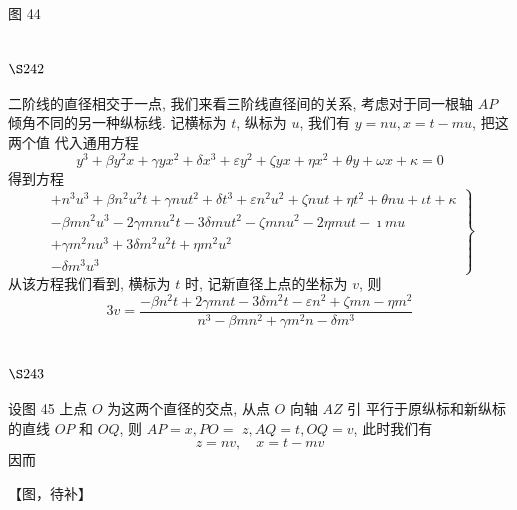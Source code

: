 图 44

\section{$\S 242$}

二阶线的直径相交于一点, 我们来看三阶线直径间的关系, 考虑对于同一根轴 $A P$ 倾角不同的另一种纵标线. 记横标为 $t$, 纵标为 $u$, 我们有 $y=n u, x=t-m u$, 把这两个值 代入通用方程
\[
y^{3}+\beta y^{2} x+\gamma y x^{2}+\delta x^{3}+\varepsilon y^{2}+\zeta y x+\eta x^{2}+\theta y+\omega x+\kappa=0
\]
得到方程
\[
\left.\begin{array}{l}
+n^{3} u^{3}+\beta n^{2} u^{2} t+\gamma n u t^{2}+\delta t^{3}+\varepsilon n^{2} u^{2}+\zeta n u t+\eta t^{2}+\theta n u+\iota t+\kappa \\
-\beta m n^{2} u^{3}-2 \gamma m n u^{2} t-3 \delta m u t^{2}-\zeta m n u^{2}-2 \eta m u t-\imath m u \\
+\gamma m^{2} n u^{3}+3 \delta m^{2} u^{2} t+\eta m^{2} u^{2} \\
-\delta m^{3} u^{3}
\end{array}\right\}
\]
从该方程我们看到, 横标为 $t$ 时, 记新直径上点的坐标为 $v$, 则
\[
3 v=\frac{-\beta n^{2} t+2 \gamma m n t-3 \delta m^{2} t-\varepsilon n^{2}+\zeta m n-\eta m^{2}}{n^{3}-\beta m n^{2}+\gamma m^{2} n-\delta m^{3}}
\]
\section{$\S 243$}

设图 45 上点 $O$ 为这两个直径的交点, 从点 $O$ 向轴 $A Z$ 引 平行于原纵标和新纵标的直线 $O P$ 和 $O Q$, 则 $A P=x, P O=$ $z, A Q=t, O Q=v$, 此时我们有
\[
z=n v, \quad x=t-m v
\]
因而


【图，待补】

